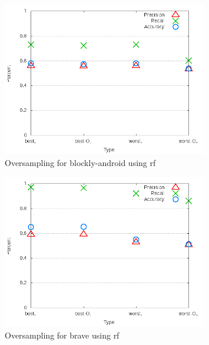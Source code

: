 \begin{figure}[!t]
\centering
\includegraphics[width=0.8\textwidth]{images/rf/test_4/blockly-android_sample_range.png}
\caption{Oversampling for blockly-android using \gls{rf}}
\label{fig:test_4_blockly-android_rf}
\end{figure}

\begin{figure}[!t]
\centering
\includegraphics[width=0.8\textwidth]{images/rf/test_4/brave_sample_range.png}
\caption{Oversampling for brave using \gls{rf}}
\label{fig:test_4_brave_rf}
\end{figure}

